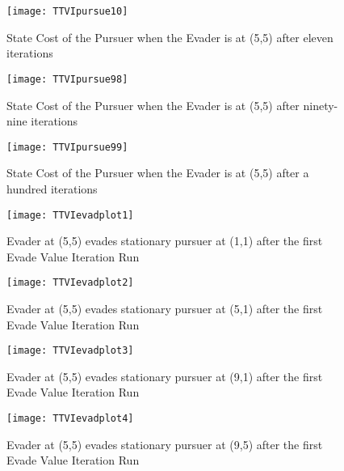 \begin{figure}
\vspace{2.4in}
\centering
\texttt{[image: TTVIpursue10]}
\caption{State Cost of the Pursuer when the Evader is at (5,5) after eleven iterations}
\label{TTVIpursue10}
\end{figure}
\clearpage
\newpage

\begin{figure}
\vspace{2.4in}
\centering
\texttt{[image: TTVIpursue98]}
\caption{State Cost of the Pursuer when the Evader is at (5,5) after ninety-nine iterations}
\label{TTVIpursue98}
\end{figure}
\clearpage
\newpage

\begin{figure}
\vspace{2.4in}
\centering
\texttt{[image: TTVIpursue99]}
\caption{State Cost of the Pursuer when the Evader is at (5,5) after a hundred iterations}
\label{TTVIpursue99}
\end{figure}
\clearpage
\newpage

\begin{figure}
\vspace{2.4in}
\centering
\texttt{[image: TTVIevadplot1]}
\caption{Evader at (5,5) evades stationary pursuer at (1,1) after the first Evade Value Iteration Run}
\label{TTVIevadplot1}
\end{figure}
\clearpage
\newpage

\begin{figure}
\vspace{2.4in}
\centering
\texttt{[image: TTVIevadplot2]}
\caption{Evader at (5,5) evades stationary pursuer at (5,1) after the first Evade Value Iteration Run}
\label{TTVIevadplot2}
\end{figure}
\clearpage
\newpage

\begin{figure}
\vspace{2.4in}
\centering
\texttt{[image: TTVIevadplot3]}
\caption{Evader at (5,5) evades stationary pursuer at (9,1) after the first Evade Value Iteration Run}
\label{TTVIevadplot3}
\end{figure}
\clearpage
\newpage

\begin{figure}
\vspace{2.4in}
\centering
\texttt{[image: TTVIevadplot4]}
\caption{Evader at (5,5) evades stationary pursuer at (9,5) after the first Evade Value Iteration Run}
\label{TTVIevadplot4}
\end{figure}
\clearpage
\newpage

